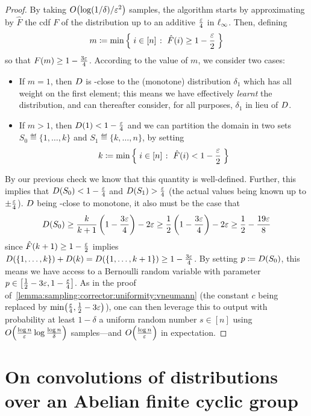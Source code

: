 \begin{proof}
By taking $\bigO{\log(1/\delta)/\eps^2}$ samples, the algorithm starts by approximating by $\hat{F}$ the cdf $F$ of the distribution up to an additive $\frac{\eps}{4}$ in $\lp[\infty]$. Then, defining
\[
    m \eqdef \min \setOfSuchThat{i \in [n]}{ \hat{F}(i) \geq 1-\frac{\eps}{2}}
\]
so that $F(m) \geq 1-\frac{3\eps}{4}$. According to the value of $m$, we consider two cases:
\begin{itemize}
  \item If $m = 1$, then $\D$ is \eps-close to the (monotone) distribution $\delta_1$ which has all weight on the first element; this means we have effectively \emph{learnt} the distribution, and can thereafter consider, for all purposes, $\delta_1$ in lieu of $\D$.  \item If $m > 1$, then $\D(1) < 1-\frac{\eps}{4}$ and we can partition the domain in two sets $S_0\eqdef\{1,\dots, k\}$ and $S_1\eqdef\{k,\dots, n\}$, by setting
\[
    k \eqdef \min \setOfSuchThat{i \in [n]}{ \hat{F}(i) < 1-\frac{\eps}{2}}
\]
\end{itemize}

By our previous check we know that this quantity is well-defined. Further, this implies that $D(S_0) < 1-\frac{\eps}{4}$ and $\D(S_1) >\frac{\eps}{4}$  (the actual values being known up to $\pm \frac{\eps}{4}$). $\D$ being \eps-close to monotone, it also must be the case that
\[
  \D(S_0) \geq \frac{k}{k+1}\left(1-\frac{3\eps}{4}\right) - 2\eps \geq \frac{1}{2}\left(1-\frac{3\eps}{4}\right) - 2\eps \geq \frac{1}{2}-\frac{19\eps}{8}
\]
since $\hat{F}(k+1) \geq 1-\frac{\eps}{2}$ implies $\D(\{1,\dots,k\})+\D(k)=\D(\{1,\dots,k+1\}) \geq 1-\frac{3\eps}{4}$. By setting $p\eqdef \D(S_0)$, this means we have access to a Bernoulli random variable with parameter $p\in\left[\frac{1}{2}-3\eps,1-\frac{\eps}{4}\right]$. As in the proof of~\autoref{lemma:sampling:corrector:uniformity:vneumann} (the constant $c$ being replaced by $\min\!\left(\frac{\eps}{4}, \frac{1}{2}-3\eps\right)$), one can then leverage this to output with probability at least $1-\delta$ a uniform random number $s\in[n]$ using $\bigO{\frac{\log n}{\eps} \log\frac{\log n}{\delta}}$ samples---and $\bigO{\frac{\log n}{\eps}}$ in expectation.
\end{proof}

\clearpage
\appendix
\section{On convolutions of distributions over an Abelian finite cyclic group}\label{appendix:convolution:abelian}

